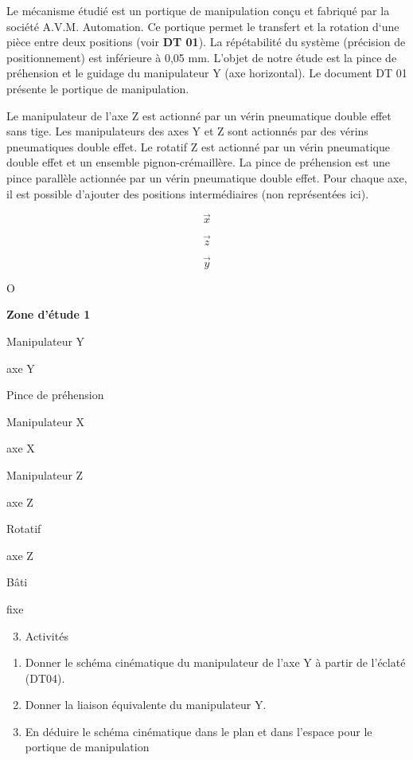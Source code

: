 Le mécanisme étudié est un portique de manipulation conçu et fabriqué
par la société A.V.M. Automation. Ce portique permet le transfert et la
rotation d`une pièce entre deux positions (voir \textbf{DT 01}). La
répétabilité du système (précision de positionnement) est inférieure à
0,05 mm. L'objet de notre étude est la pince de préhension et le guidage
du manipulateur Y (axe horizontal). Le document DT 01 présente le
portique de manipulation.

Le manipulateur de l'axe Z est actionné par un vérin pneumatique double
effet sans tige. Les manipulateurs des axes Y et Z sont actionnés par
des vérins pneumatiques double effet. Le rotatif Z est actionné par un
vérin pneumatique double effet et un ensemble pignon-crémaillère. La
pince de préhension est une pince parallèle actionnée par un vérin
pneumatique double effet. Pour chaque axe, il est possible d'ajouter des
positions intermédiaires (non représentées ici).

\[\overrightarrow{x}\]

\[\overrightarrow{z}\]

\[\overrightarrow{y}\]

O

\textbf{Zone d'étude 1}

Manipulateur Y

axe Y

Pince de préhension

Manipulateur X

axe X

Manipulateur Z

axe Z

Rotatif

axe Z

Bâti

fixe

\begin{enumerate}
\setcounter{enumi}{2}
\item
  Activités
\end{enumerate}

\begin{enumerate}
\def\labelenumi{\arabic{enumi}.}
\item
  Donner le schéma cinématique du manipulateur de l'axe Y à partir de
  l'éclaté (DT04).
\item
  Donner la liaison équivalente du manipulateur Y.
\item
  En déduire le schéma cinématique dans le plan et dans l'espace pour le
  portique de manipulation
\end{enumerate}

